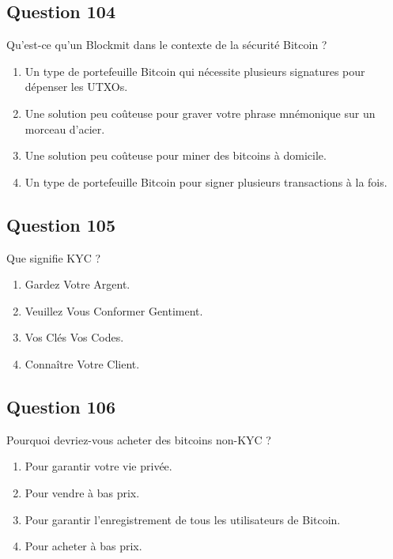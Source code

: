 \documentclass[12pt,a4paper]{article}
\begin{document}
\bigskip


\subsection*{Question 104}
Qu'est-ce qu'un Blockmit dans le contexte de la sécurité Bitcoin ?

\begin{enumerate}[label=\Alph*., leftmargin=*]
\item Un type de portefeuille Bitcoin qui nécessite plusieurs signatures pour dépenser les UTXOs.
\item Une solution peu coûteuse pour graver votre phrase mnémonique sur un morceau d'acier.
\item Une solution peu coûteuse pour miner des bitcoins à domicile.
\item Un type de portefeuille Bitcoin pour signer plusieurs transactions à la fois.
\end{enumerate}

\bigskip


\subsection*{Question 105}
Que signifie KYC ?

\begin{enumerate}[label=\Alph*., leftmargin=*]
\item Gardez Votre Argent.
\item Veuillez Vous Conformer Gentiment.
\item Vos Clés Vos Codes.
\item Connaître Votre Client.
\end{enumerate}

\bigskip


\subsection*{Question 106}
Pourquoi devriez-vous acheter des bitcoins non-KYC ?

\begin{enumerate}[label=\Alph*., leftmargin=*]
\item Pour garantir votre vie privée.
\item Pour vendre à bas prix.
\item Pour garantir l'enregistrement de tous les utilisateurs de Bitcoin.
\item Pour acheter à bas prix.
\end{enumerate}
\end{document}
